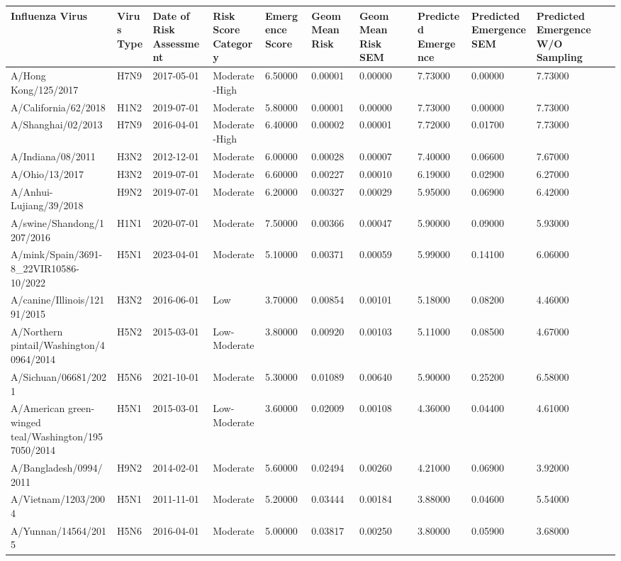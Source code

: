 \begin{tabular}{L{1in}|L{1in}|L{1in}|L{1in}|L{1in}|L{1in}|L{1in}|L{1in}|L{1in}|L{1in}}\hline
 Influenza  Virus & Virus  Type & Date  of  Risk  Assessment & Risk  Score  Category & Emergence  Score & Geom  Mean  Risk & Geom  Mean  Risk  SEM & Predicted  Emergence & Predicted  Emergence  SEM & Predicted  Emergence  W/O  Sampling \\\hline
 A/Hong  Kong/125/2017 &H7N9&2017-05-01& Moderate-High &6.50000&0.00001&0.00000&7.73000&0.00000&7.73000\\\hline
 A/California/62/2018 &H1N2&2019-07-01& Moderate &5.80000&0.00001&0.00000&7.73000&0.00000&7.73000\\\hline
 A/Shanghai/02/2013 &H7N9&2016-04-01& Moderate-High &6.40000&0.00002&0.00001&7.72000&0.01700&7.73000\\\hline
 A/Indiana/08/2011 &H3N2&2012-12-01& Moderate &6.00000&0.00028&0.00007&7.40000&0.06600&7.67000\\\hline
 A/Ohio/13/2017 &H3N2&2019-07-01& Moderate &6.60000&0.00227&0.00010&6.19000&0.02900&6.27000\\\hline
 A/Anhui-Lujiang/39/2018 &H9N2&2019-07-01& Moderate &6.20000&0.00327&0.00029&5.95000&0.06900&6.42000\\\hline
 A/swine/Shandong/1207/2016 &H1N1&2020-07-01& Moderate &7.50000&0.00366&0.00047&5.90000&0.09000&5.93000\\\hline
 A/mink/Spain/3691-8\_22VIR10586-10/2022 &H5N1&2023-04-01& Moderate &5.10000&0.00371&0.00059&5.99000&0.14100&6.06000\\\hline
 A/canine/Illinois/12191/2015 &H3N2&2016-06-01&Low&3.70000&0.00854&0.00101&5.18000&0.08200&4.46000\\\hline
 A/Northern  pintail/Washington/40964/2014 &H5N2&2015-03-01& Low-Moderate &3.80000&0.00920&0.00103&5.11000&0.08500&4.67000\\\hline
 A/Sichuan/06681/2021 &H5N6&2021-10-01& Moderate &5.30000&0.01089&0.00640&5.90000&0.25200&6.58000\\\hline
 A/American  green-winged  teal/Washington/1957050/2014 &H5N1&2015-03-01& Low-Moderate &3.60000&0.02009&0.00108&4.36000&0.04400&4.61000\\\hline
 A/Bangladesh/0994/2011 &H9N2&2014-02-01& Moderate &5.60000&0.02494&0.00260&4.21000&0.06900&3.92000\\\hline
 A/Vietnam/1203/2004 &H5N1&2011-11-01& Moderate &5.20000&0.03444&0.00184&3.88000&0.04600&5.54000\\\hline
 A/Yunnan/14564/2015 &H5N6&2016-04-01& Moderate &5.00000&0.03817&0.00250&3.80000&0.05900&3.68000\\\hline

\end{tabular}
